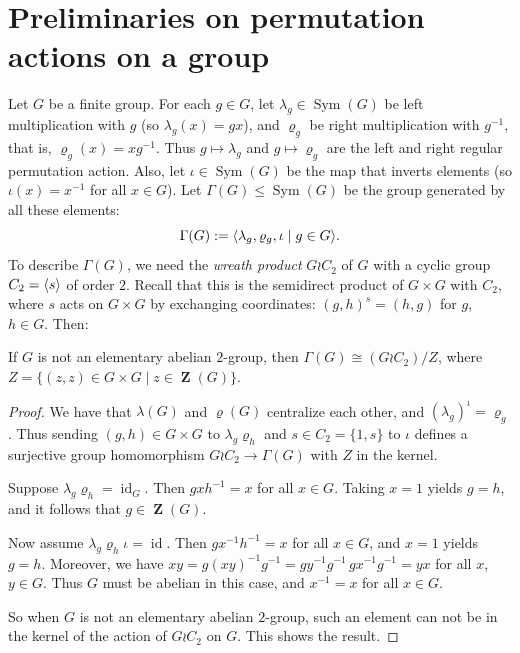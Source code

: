 \documentclass[ALCO,Unicode]{cedram}
\renewcommand{\rho}{\varrho}
\renewcommand{\leq}{\leqslant}
\newcommand{\iso}{\cong}    %
\newcommand{\Sym}[1]{\operatorname{Sym}(#1)}  %
\DeclarePairedDelimiter{\erz}{\langle}{\rangle} %
\DeclareMathOperator{\Zentr}{\mathbf{Z}}     %
\DeclareMathOperator{\Id}{id}       %
\begin{document}
\section{Preliminaries on permutation actions on a group}
Let $G$ be a finite group.
For each $g\in G$, let $\lambda_g\in \Sym{G}$ 
be left multiplication with $g$
(so $\lambda_g(x)= gx$),
and $\rho_g$ be right multiplication
with $g^{-1}$, that is, $\rho_g(x)= xg^{-1}$.
Thus $g\mapsto \lambda_g$ and $g\mapsto \rho_g$ are 
the left and right regular permutation action.
Also, let $\iota\in \Sym{G}$ be the map that 
inverts elements (so $\iota(x)= x^{-1}$ for all $x\in G$).
Let $\Gamma(G)\leq \Sym{G}$ be the group generated by all these
elements:
\[ \Gamma(G):= \erz{\lambda_g, \rho_g, \iota
                   \mid g\in G}.
\]
To describe $\Gamma(G)$, we need the
\emph{wreath product} $G\wr C_2$ 
of $G$ with a cyclic group~$C_2=\erz{s}$
of order $2$.
Recall that this is the semidirect product of
$G\times G$ with $C_2$, where $s$ acts on 
$G\times G$ by exchanging coordinates:
$(g,h)^s = (h,g)$ for $g$, $h\in G$.
Then:

\begin{lemma}
  If $G$ is not an elementary abelian $2$-group,
  then $\Gamma(G) \iso (G\wr C_2)/Z$,
  where $Z = \{(z,z)\in G \times G \mid z \in \Zentr(G)\}$.
\end{lemma}

\begin{proof}
  We have that $\lambda(G)$ and $\rho(G)$ centralize each other,
  and $(\lambda_g)^{\iota} = \rho_g$.
  Thus sending $(g,h)\in G\times G$ to
  $\lambda_g \rho_h$ and $s\in C_2 = \{1,s\}$
  to $\iota$ defines a surjective group homomorphism
  $G\wr C_2 \to \Gamma(G)$
  with $Z$ in the kernel.
  
  Suppose $\lambda_g \rho_h = \Id_G$.
  Then $gxh^{-1} = x$ for all $x\in G$.
  Taking $x=1$ yields $g=h$, 
  and it follows that  $g\in \Zentr(G)$.
  
  Now assume $\lambda_g \rho_h \iota = \Id$.
  Then $gx^{-1}h^{-1} = x$ for all $x\in G$,
  and $x=1$ yields $g=h$.
  Moreover, we have
  $xy = g (xy)^{-1} g^{-1}
      = g y^{-1} g^{-1} \, g x^{-1} g^{-1}
      = y x$
  for all $x$, $y\in G$.
  Thus $G$ must be abelian in this case, and
  $x^{-1} = x$ for all $x\in G$.
    
  So when $G$ is not an elementary abelian $2$-group,
  such an element can not be in the kernel of the action
  of $G\wr C_2$ on $G$.
  This shows the result.
\end{proof}
\end{document}
